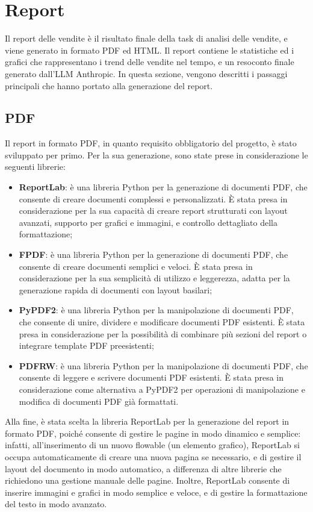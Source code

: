 \section{Report}

Il report delle vendite è il risultato finale della task di analisi delle vendite, e viene generato in formato PDF ed HTML. Il report contiene le statistiche ed i grafici che rappresentano i trend delle vendite nel tempo, e un resoconto finale generato dall'LLM Anthropic.
In questa sezione, vengono descritti i passaggi principali che hanno portato alla generazione del report.

\subsection{PDF}

Il report in formato PDF, in quanto requisito obbligatorio del progetto, è stato sviluppato per primo. Per la sua generazione, sono state prese in considerazione le seguenti librerie:
\begin{itemize}
    \item \textbf{ReportLab}: è una libreria Python per la generazione di documenti PDF, che consente di creare documenti complessi e personalizzati. È stata presa in considerazione per la sua capacità di creare report strutturati con layout avanzati, supporto per grafici e immagini, e controllo dettagliato della formattazione;
    \item \textbf{FPDF}: è una libreria Python per la generazione di documenti PDF, che consente di creare documenti semplici e veloci. È stata presa in considerazione per la sua semplicità di utilizzo e leggerezza, adatta per la generazione rapida di documenti con layout basilari;
    \item \textbf{PyPDF2}: è una libreria Python per la manipolazione di documenti PDF, che consente di unire, dividere e modificare documenti PDF esistenti. È stata presa in considerazione per la possibilità di combinare più sezioni del report o integrare template PDF preesistenti;
    \item \textbf{PDFRW}: è una libreria Python per la manipolazione di documenti PDF, che consente di leggere e scrivere documenti PDF esistenti. È stata presa in considerazione come alternativa a PyPDF2 per operazioni di manipolazione e modifica di documenti PDF già formattati.
\end{itemize}

Alla fine, è stata scelta la libreria ReportLab per la generazione del report in formato PDF, poiché consente di gestire le pagine in modo dinamico e semplice: infatti, all'inserimento di un nuovo flowable (un elemento grafico), ReportLab si occupa automaticamente di creare una nuova pagina se necessario, e di gestire il layout del documento in modo automatico, a differenza di altre librerie che richiedono una gestione manuale delle pagine. Inoltre, ReportLab consente di inserire immagini e grafici in modo semplice e veloce, e di gestire la formattazione del testo in modo avanzato.

